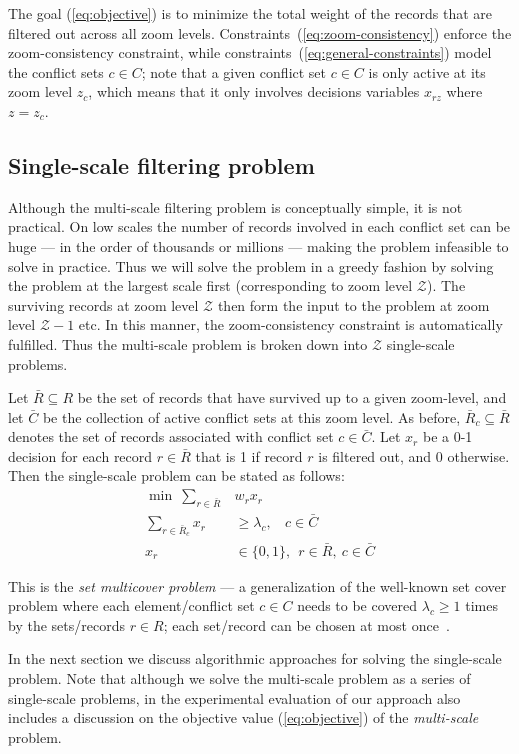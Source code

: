 The goal (\ref{eq:objective}) is to minimize the total weight of the records that are filtered out across all zoom levels. Constraints~(\ref{eq:zoom-consistency}) enforce the zoom-consistency constraint, while constraints~(\ref{eq:general-constraints}) model the conflict sets $c \in C$; note that a given conflict set $c \in C$ is only active at its zoom level $z_c$, which means that it only involves decisions variables $x_{rz}$ where $z = z_c$.

\subsection{Single-scale filtering problem}

Although the multi-scale filtering problem is conceptually simple, it is not practical. On low scales the number of records involved in each conflict set can be huge --- in the order of thousands or millions --- making the problem infeasible to solve in practice. Thus we will solve the problem in a greedy fashion by solving the problem at the largest scale first (corresponding to zoom level $\mathcal{Z}$). The surviving records at zoom level $\mathcal{Z}$ then form the input to the problem at zoom level $\mathcal{Z}-1$ etc. In this manner, the zoom-consistency constraint is automatically fulfilled. Thus the multi-scale problem is broken down into $\mathcal{Z}$ single-scale problems.

\vspace{5em}

Let $\bar{R} \subseteq R$ be the set of records that have survived up to a given zoom-level, and let $\bar{C}$ be the collection of active conflict sets at this zoom level. As before, $\bar{R}_c \subseteq \bar{R}$ denotes the set of records associated with conflict set $c \in \bar{C}$. Let $x_r$ be a 0-1 decision for each record $r \in \bar{R}$ that is 1 if record $r$ is filtered out, and 0 otherwise. Then the single-scale problem can be stated as follows:
\begin{align}
  \label{eq:objective-single}
  \min ~\sum_{r \in \bar{R}} &w_r x_r \\
  \label{eq:general-constraints-single}
  \sum_{r \in \bar{R}_c} x_r &\geq \lambda_c, ~~~~ c \in \bar{C} \\
  x_r & \in \{0, 1\}, ~~ r \in \bar{R}, ~c \in \bar{C}
\end{align}

This is the \emph{set multicover problem} --- a generalization of the well-known set cover problem where each element/conflict set $c \in C$ needs to be covered $\lambda_c \geq 1$ times by the sets/records $r \in R$; each set/record can be chosen at most once~\cite{rajagopalan1998primal}. 

In the next section we discuss algorithmic approaches for solving the single-scale problem. Note that although we solve the multi-scale problem as a series of single-scale problems, in the experimental evaluation of our approach also includes a discussion on the objective value (\ref{eq:objective}) of the \emph{multi-scale} problem. 

